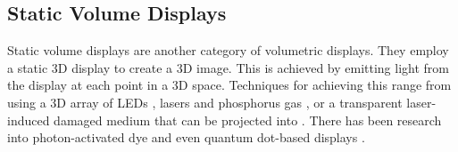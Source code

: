 \begin{invisBox}
  
  \hfill
\end{invisBox}

\subsection{Static Volume Displays}
Static volume displays are another category of volumetric displays. They employ a static 3D display to create a 3D image. This is achieved by emitting light from the display at each point in a 3D space. Techniques for achieving this range from using a 3D array of LEDs \cite{10.1145/2341931.2341937}, lasers and phosphorus gas \cite{https://doi.org/10.1002/anie.202003160}, or a transparent laser-induced damaged medium that can be projected into \cite{10.1145/1179849.1179982}. There has been research into photon-activated dye \cite{Patel2017} and even quantum dot-based displays \cite{Hirayama2015}.

